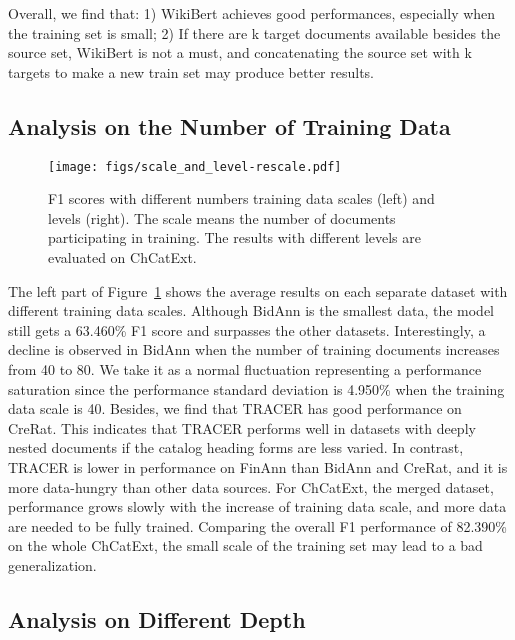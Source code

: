 \documentclass[runningheads]{llncs}
\begin{document}
Overall, we find that:
1) WikiBert achieves good performances, especially when the training set is small;
2) If there are k target documents available besides the source set, WikiBert is not a must, and concatenating the source set with k targets to make a new train set may produce better results.




\subsection{Analysis on the Number of Training Data}

\begin{figure}[t]
    \centering
    \texttt{[image: figs/scale\_and\_level-rescale.pdf]}
    \caption{F1 scores with different numbers   training data scales (left) and levels (right). The scale means the number of documents participating in training. The results with different levels are evaluated on ChCatExt.}
    \label{fig:scale_and_level}
\end{figure}

The left part of Figure~\ref{fig:scale_and_level} shows the average results on each separate dataset with different training data scales.
Although BidAnn is the smallest data, the model still gets a 63.460\% F1 score and surpasses the other datasets.
Interestingly, a decline is observed in BidAnn when the number of training documents increases from 40 to 80.
We take it as a normal fluctuation representing a performance saturation since the performance standard deviation is 4.950\% when the training data scale is 40.
Besides, we find that TRACER has good performance on CreRat.
This indicates that TRACER performs well in datasets with deeply nested documents if the catalog heading forms are less varied.
In contrast, TRACER is lower in performance on FinAnn than BidAnn and CreRat, and it is more data-hungry than other data sources.
For ChCatExt, the merged dataset, performance grows slowly with the increase of training data scale, and more data are needed to be fully trained.
Comparing the overall F1 performance of 82.390\% on the whole ChCatExt, the small scale of the training set may lead to a bad generalization.

\subsection{Analysis on Different Depth}
\end{document}
